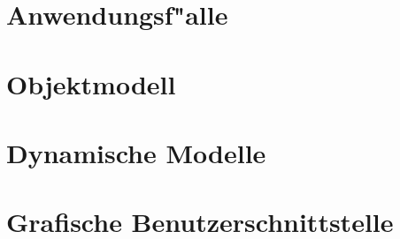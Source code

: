 \section{Anwendungsf"alle}

\section{Objektmodell}

\section{Dynamische Modelle}

\section{Grafische Benutzerschnittstelle}